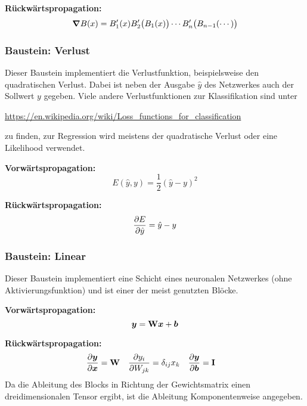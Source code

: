 				\textbf{Rückwärtspropagation:}
				\begin{equation}
					\grad{B}(x) = B_1'(x) B_2'\bigl( B_1(x) \bigr) \cdots B_n'\bigl( B_{n - 1}(\cdots) \bigr)
				\end{equation}

			\subsubsection{Baustein: Verlust}
				Dieser Baustein implementiert die Verlustfunktion, beispielsweise den quadratischen Verlust. Dabei ist neben der Ausgabe \(\hat{y}\) des Netzwerkes auch der Sollwert \(y\) gegeben. Viele andere Verlustfunktionen zur Klassifikation sind unter
				\begin{center}
					\url{https://en.wikipedia.org/wiki/Loss_functions_for_classification}
				\end{center}
				zu finden, zur Regression wird meistens der quadratische Verlust oder eine Likelihood verwendet.

				\textbf{Vorwärtspropagation:}
				\begin{equation}
					E(\hat{y}, y) = \frac{1}{2} (\hat{y} - y)^2
				\end{equation}

				\textbf{Rückwärtspropagation:}
				\begin{equation}
					\pdv{E}{\hat{y}} = \hat{y} - y
				\end{equation}

			\subsubsection{Baustein: Linear}
				Dieser Baustein implementiert eine Schicht eines neuronalen Netzwerkes (ohne Aktivierungsfunktion) und ist einer der meist genutzten Blöcke.

				\textbf{Vorwärtspropagation:}
				\begin{equation}
					\bm{y} = \bm{\mathrm{W}} \bm{x} + \bm{b}
				\end{equation}

				\textbf{Rückwärtspropagation:}
				\begin{align}
					\pdv{\bm{y}}{\bm{x}} &= \bm{\mathrm{W}} &
					\pdv{y_i}{W_{jk}} &= \delta_{ij} x_k &
					\pdv{\bm{y}}{\bm{b}} &= \bm{\mathrm{I}}
				\end{align}
				Da die Ableitung des Blocks in Richtung der Gewichtsmatrix einen dreidimensionalen Tensor ergibt, ist die Ableitung Komponentenweise angegeben.

